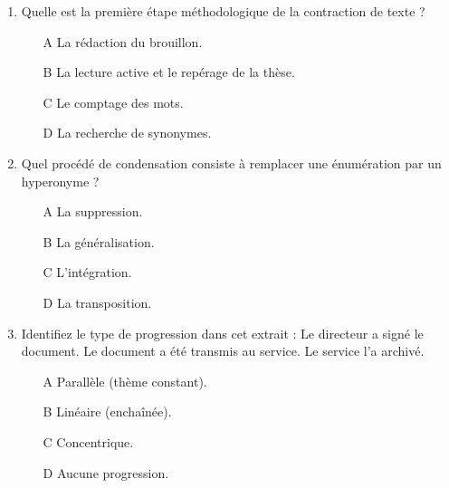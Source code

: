 \documentclass[11pt]{article}
\begin{document}
\begin{exercice}
\begin{enumerate}
    \item Quelle est la première étape méthodologique de la contraction de texte ?
    \begin{itemize}
        \item[A] La rédaction du brouillon.
        \item[B] La lecture active et le repérage de la thèse.
        \item[C] Le comptage des mots.
        \item[D] La recherche de synonymes.
    \end{itemize}
    \item Quel procédé de condensation consiste à remplacer une énumération par un hyperonyme ?
    \begin{itemize}
        \item[A] La suppression.
        \item[B] La généralisation.
        \item[C] L'intégration.
        \item[D] La transposition.
    \end{itemize}
    \item Identifiez le type de progression dans cet extrait : \og Le directeur a signé le document. Le document a été transmis au service. Le service l'a archivé.\fg{}
    \begin{itemize}
        \item[A] Parallèle (thème constant).
        \item[B] Linéaire (enchaînée).
        \item[C] Concentrique.
        \item[D] Aucune progression.
    \end{itemize}
\end{enumerate}
\end{exercice}
\end{document}
